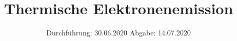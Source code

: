 

\subject{V504}
\title{Thermische Elektronenemission}
\date{%
  Durchführung: 30.06.2020
  \hspace{3em}
  Abgabe: 14.07.2020
}



\maketitle
\thispagestyle{empty}
\tableofcontents
\newpage







\nocite{*}
\printbibliography{}


